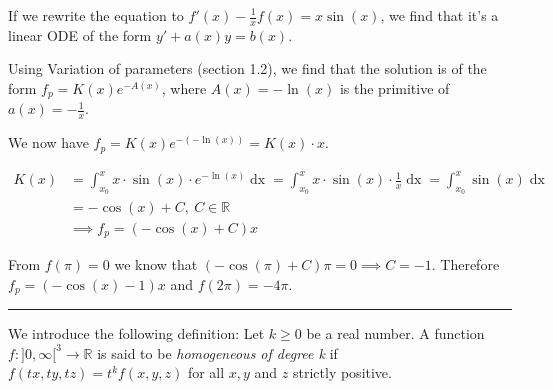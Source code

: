 \documentclass[a4paper,fontsize = 10pt]{article}
\def\R{\mathbb{R}}
\begin{document}
\vspace{0.1cm}
If we rewrite the equation to \(f'(x) - \frac{1}{x}f(x) = x \sin(x)\), we find that it's a linear ODE of the form $y' + a(x)y = b(x)$.

Using Variation of parameters (section 1.2), we find that the solution is of the form \(f_p = K(x) e^{-A(x)}\), where $A(x) = -\ln(x)$ is the primitive of $a(x) = -\frac{1}{x}$.

We now have \(f_p = K(x) e^{-(-\ln(x))} = K(x) \cdot x\).

\begin{align*}
  K(x) &= \int_{x_0}^x x\cdot \sin(x) \cdot e^{-\ln(x)} \mathop{dx} = \int_{x_0}^x x\cdot \sin(x) \cdot \frac{1}{x} \mathop{dx} =  \int_{x_0}^x \sin(x) \mathop{dx}\\
  &= -\cos(x) + C, \ C \in \R\\
  &\implies f_p = (-\cos(x) + C)x
\end{align*}

From $f(\pi) = 0$ we know that $(-\cos(\pi) + C) \pi = 0 \implies C = -1$. Therefore $f_p = (-\cos(x) - 1)x$ and $f(2\pi) = -4 \pi$.

\vspace{0.1 cm}
\hrule
\vspace{0.2 cm}
We introduce the following definition: Let $k \geq 0$ be a real number. A function $f : ]0, \infty[^3 \to \R$ is said to be \textit{homogeneous of degree k} if $f (tx, ty, tz) =t^k f(x, y, z)$ for all $x, y$ and $z$ strictly positive. 

\vspace{0.2cm}
\end{document}

